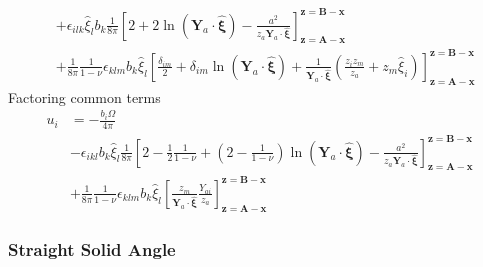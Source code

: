 \documentclass[10pt]{report}
\begin{document}
{\begin{align}
 &+\epsilon_{ilk}\hat{\xi}_lb_k\frac{1}{8\pi}\left[2+ 2\ln\left(\bm Y_a \cdot \hat{\bm \xi}\right)-\frac{a^2}{z_a \bm Y_a \cdot \hat{\bm \xi}}\right]^{\bm z=\bm B-\bm x}_{\bm z=\bm A-\bm x}  \nonumber\\
 &+\frac{1}{8\pi}\frac{1}{1-\nu} \epsilon_{klm}b_k\hat{\xi}_l\left[\frac{ \delta_{im}}{2}
+ \delta_{im}\ln\left(\bm Y_a \cdot \hat{\bm \xi}\right)
+ \frac{1}{ \bm Y_a \cdot \hat{\bm \xi}}\left(\frac{z_iz_m}{z_a}+z_m\hat{\xi}_i\right) \right]^{\bm z=\bm B-\bm x}_{\bm z=\bm A-\bm x}
\end{align}
Factoring common terms
\begin{align}
 u_i &=-\frac{ b_i\Omega}{4\pi}\nonumber\\
 &-\epsilon_{ikl}b_k\hat{\xi}_l\frac{1}{8\pi}\left[2-\frac{1}{2}\frac{1}{1-\nu}+ \left(2-\frac{1}{1-\nu}\right)\ln\left(\bm Y_a \cdot \hat{\bm \xi}\right)-\frac{a^2}{z_a \bm Y_a \cdot \hat{\bm \xi}}
 \right]^{\bm z=\bm B-\bm x}_{\bm z=\bm A-\bm x}  \nonumber\\
 &+\frac{1}{8\pi}\frac{1}{1-\nu} \epsilon_{klm}b_k\hat{\xi}_l\left[
 \frac{z_m}{ \bm Y_a \cdot \hat{\bm \xi}}\frac{Y_{ai}}{z_a} \right]^{\bm z=\bm B-\bm x}_{\bm z=\bm A-\bm x}
\end{align}

\subsubsection{Straight Solid Angle}

}
\end{document}
